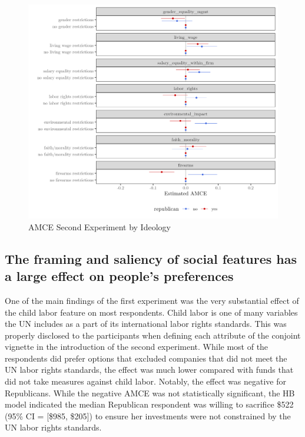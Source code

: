 \documentclass[
  12pt,
]{article}
\begin{document}
\begin{figure}

{\centering \includegraphics{amce2_byr_shorter} 

}

\caption{AMCE Second Experiment by Ideology}\label{fig:amce2byr}
\end{figure}

\hypertarget{the-framing-and-saliency-of-social-features-has-a-large-effect-on-peoples-preferences}{%
\subsection{The framing and saliency of social features has a large effect on people's preferences}\label{the-framing-and-saliency-of-social-features-has-a-large-effect-on-peoples-preferences}}

One of the main findings of the first experiment was the very substantial effect of the child labor feature on most respondents. Child labor is one of many variables the UN includes as a part of its international labor rights standards. This was properly disclosed to the participants when defining each attribute of the conjoint vignette in the introduction of the second experiment. While most of the respondents did prefer options that excluded companies that did not meet the UN labor rights standards, the effect was much lower compared with funds that did not take measures against child labor. Notably, the effect was negative for Republicans. While the negative AMCE was not statistically significant, the HB model indicated the median Republican respondent was willing to sacrifice \$522 (95\% CI = {[}\$985, \$205{]}) to ensure her investments were not constrained by the UN labor rights standards.
\end{document}
